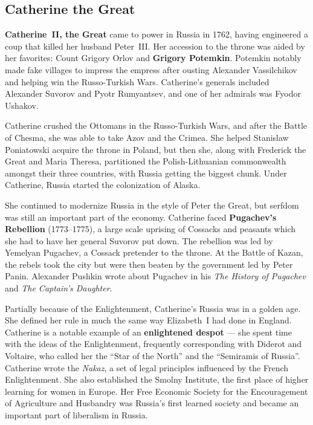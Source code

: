 \subsection*{Catherine the Great}

\textbf{Catherine~II, the Great} came to power in Russia in 1762,
having engineered a coup that killed her husband Peter~III\@.
Her accession to the throne was aided by her favorites:
Count Grigory Orlov and \textbf{Grigory Potemkin}.
Potemkin notably made fake villages to impress the empress
after ousting Alexander Vassilchikov and helping win the Russo-Turkish Wars.
Catherine's generals included Alexander Suvorov and Pyotr Rumyantsev,
and one of her admirals was Fyodor Ushakov.

Catherine crushed the Ottomans in the Russo-Turkish Wars,
and after the Battle of Chesma, she was able to take Azov and the Crimea.
She helped Stanislaw Poniatowski acquire the throne in Poland,
but then she, along with Frederick the Great and Maria Theresa,
partitioned the Polish-Lithuanian commonwealth amongst their three countries,
with Russia getting the biggest chunk.
Under Catherine, Russia started the colonization of Alaska.

She continued to modernize Russia in the style of Peter the Great,
but serfdom was still an important part of the economy.
Catherine faced \textbf{Pugachev's Rebellion} (1773--1775),
a large scale uprising of Cossacks and peasants
which she had to have her general Suvorov put down.
The rebellion was led by Yemelyan Pugachev, a Cossack pretender to the throne.
At the Battle of Kazan,
the rebels took the city but were then beaten by the government led by Peter Panin.
Alexander Pushkin wrote about Pugachev in his
\textit{The History of Pugachev} and \textit{The Captain's Daughter}.

Partially because of the Enlightenment, Catherine's Russia was in a golden age.
She defined her rule in much the same way Elizabeth~I had done in England.
Catherine is a notable example of an \textbf{enlightened despot} ---
she spent time with the ideas of the Enlightenment,
frequently corresponding with Diderot and Voltaire,
who called her the ``Star of the North'' and the ``Semiramis of Russia''.
Catherine wrote the \textit{Nakaz},
a set of legal principles influenced by the French Enlightenment.
She also established the Smolny Institute, the first place of higher learning for women in Europe.
Her Free Economic Society for the Encouragement of Agriculture and Husbandry
was Russia's first learned society and became an important part of liberalism in Russia.

